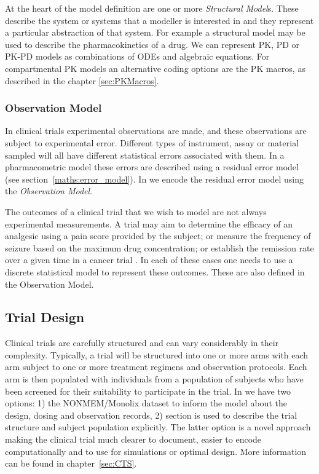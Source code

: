 At the heart of the model definition are one or more \emph{Structural
Model}s. These describe the system or systems that a modeller is
interested in and they represent a particular abstraction of that
system. For example a structural model may be used to describe the
pharmacokinetics of a drug. We can represent PK, PD or PK-PD models as
combinations of ODEs and algebraic equations. For compartmental
PK models an alternative coding options are the PK macros, as described
in the chapter \ref{sec:PKMacros}.
\subsubsection{Observation Model}

In clinical trials experimental observations are made, and these
observations are subject to experimental error. Different types of
instrument, assay or material sampled will all have different
statistical errors associated with them. In a pharmacometric model
these errors are described using a residual error model (see
section~\ref{maths:error_model}). In \pharmml we encode the residual
error model using the \emph{Observation Model}.


The outcomes of a clinical trial that we wish to model are not always
experimental measurements. A trial may aim to determine the efficacy
of an analgesic using a pain score provided by the subject; or measure
the frequency of seizure based on the maximum drug concentration; or
establish the remission rate over a given time in a cancer trial
\cite{Bonate:2011fk}. In each of these cases one needs to use a
discrete statistical model to represent these outcomes. These are also
defined in the Observation Model.

\subsection{Trial Design}
\label{sec:trialdesign_model}

Clinical trials are carefully structured and can vary considerably in
their complexity. Typically, a trial will be structured into one or
more arms with each arm subject to one or more treatment regimens
and observation protocols. Each arm is then populated with individuals
from a population of subjects who have been screened for their
suitability to participate in the trial. In \pharmml we have two options: 1)
the NONMEM/Monolix dataset to inform the model about the 
design, dosing and observation records, 2)  section is used 
to describe the trial structure and subject population explicitly.
The latter option is a novel approach making the clinical trial much clearer 
to document, easier to encode computationally and to use for simulations 
or optimal design. More information can be found in chapter~\ref{sec:CTS}.

